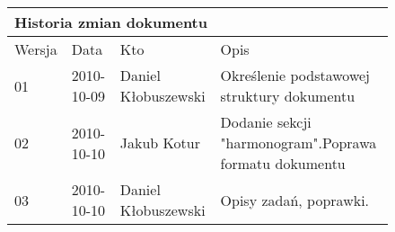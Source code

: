 \begin{figure}[h]
	\centering

\begin{tabular}{|p{}|p{}|p{}|p{}|}
	\hline
	\multicolumn{4}{|l|}{Historia zmian dokumentu} \\
	\hline
	Wersja & Data & Kto & Opis \\
	\hline
	01 & 2010-10-09 & Daniel Kłobuszewski &
	Określenie podstawowej struktury dokumentu \\
	\hline
	02 & 2010-10-10 & Jakub Kotur &
	Dodanie sekcji "harmonogram".\newline  Poprawa formatu dokumentu \\
	\hline
	03 & 2010-10-10 & Daniel Kłobuszewski &
	Opisy zadań, poprawki. \\
	\hline
\end{tabular}

	\label{tab:metric}
\end{figure}

